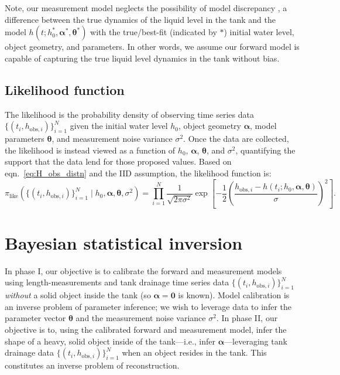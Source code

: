 \documentclass[openacc]{rsproca_new}%
\newcommand\thedata {$\{(t_i,h_{\text{obs}, i})\}_{i=1}^{N}$\xspace}
\newcommand\thedatanomath {\{(t_i,h_{\text{obs}, i})\}_{i=1}^{N}}
\begin{document}

Note, our measurement model neglects the possibility of model discrepancy \cite{brynjarsdottir2014learning,kennedy2001bayesian}, a difference between the true dynamics of the liquid level in the tank and the model $h(t; h_0^*,  \boldsymbol \alpha^*, \boldsymbol \theta^*)$ with the true/best-fit (indicated by $*$) initial water level, object geometry, and parameters. In other words, we assume our forward model is capable of capturing the true liquid level dynamics in the tank without bias.


\subsection{Likelihood function}
The likelihood is the probability density of observing time series data \thedata given the initial water level $h_0$, object geometry $\boldsymbol \alpha$, model parameters $\boldsymbol \theta$, and measurement noise variance $\sigma^2$. Once the data are collected, the likelihood is instead viewed as a function of $h_0$, $\boldsymbol \alpha$, $\boldsymbol \theta$, and $\sigma^2$, quantifying the support that the data lend for those proposed values. Based on eqn.~\ref{eq:H_obs_distn} and the IID assumption, the likelihood function is:
\begin{equation}
 \pi_{\text{like}}(\thedatanomath \mid h_0,\boldsymbol  \alpha, \boldsymbol \theta, \sigma^2 ) = \prod_{i=1}^N \frac{1}{\sqrt{2\pi\sigma^2}} \exp \left[-\frac{1}{2}\left(\frac{h_{\text{obs}, i} - h(t_i; h_0, \boldsymbol\alpha, \boldsymbol\theta)}{\sigma} \right)^2 \right]. \label{eq:like}
\end{equation}

\section{Bayesian statistical inversion} \label{sec:bsi}
In phase I, our objective is to calibrate the forward and measurement models using length-measurements and tank drainage time series data \thedata \emph{without} a solid object inside the tank (so $\boldsymbol \alpha=\mathbf{0}$ is known).
Model calibration is an inverse problem of parameter inference; we wish to leverage data to infer the parameter vector $\boldsymbol \theta$ and the measurement noise variance $\sigma^2$. 
In phase II, our objective is to, using the calibrated forward and measurement model, infer the shape of a heavy, solid object inside of the tank---i.e., infer $\boldsymbol \alpha$---leveraging tank drainage data \thedata when an object resides in the tank. This constitutes an inverse problem of reconstruction. 
\end{document}
